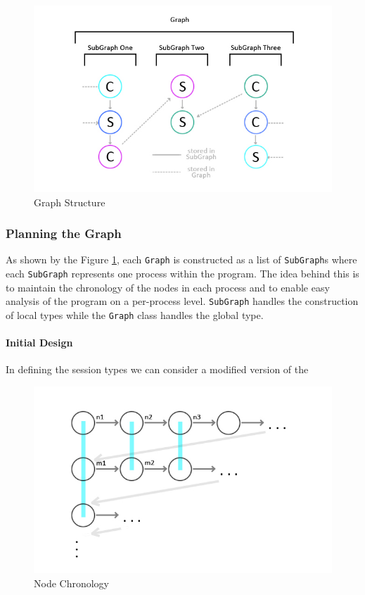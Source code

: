 \documentclass[11pt, abstracton, twoside, titlepage=true]{scrartcl}
\begin{document}
\begin{figure}[h!]
	\centering
	\includegraphics[width=\textwidth]{images/GSG.jpg}
	\caption{Graph Structure} \label{graphStructure}
\end{figure}

\subsubsection{Planning the Graph}
As shown by the Figure \ref{graphStructure}, each \texttt{Graph} is constructed as
a list of \texttt{SubGraph}s where each \texttt{SubGraph} represents
one process within the program. The idea behind this is to maintain
the chronology of the nodes in each process and to enable easy analysis
of the program on a per-process level. \texttt{SubGraph} handles the construction
of local types while the \texttt{Graph} class handles the global type.

\paragraph{Initial Design}
In defining the session types we can consider a modified version of the 

\begin{figure}[h!]
	\centering
	\includegraphics[width=\textwidth]{images/GraphOneFix.jpg}
	\caption{Node Chronology} \label{nodegraphone}
\end{figure}
\end{document}
